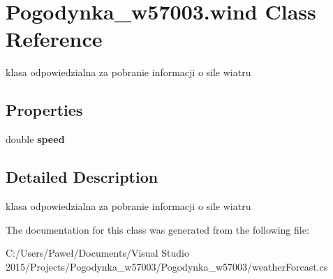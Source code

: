 \hypertarget{class_pogodynka__w57003_1_1wind}{}\section{Pogodynka\+\_\+w57003.\+wind Class Reference}
\label{class_pogodynka__w57003_1_1wind}


klasa odpowiedzialna za pobranie informacji o sile wiatru  


\subsection*{Properties}
\begin{DoxyCompactItemize}
\item 
\mbox{\label{class_pogodynka__w57003_1_1wind_a1cd0dc18ac6778b01f7d5d24bcbf22a8}} 
double {\bfseries speed}
\end{DoxyCompactItemize}


\subsection{Detailed Description}
klasa odpowiedzialna za pobranie informacji o sile wiatru 



The documentation for this class was generated from the following file\+:\begin{DoxyCompactItemize}
\item 
C\+:/\+Users/\+Paweł/\+Documents/\+Visual Studio 2015/\+Projects/\+Pogodynka\+\_\+w57003/\+Pogodynka\+\_\+w57003/weather\+Forcast.\+cs\end{DoxyCompactItemize}
